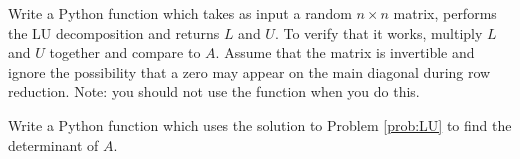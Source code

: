 \begin{problem}
\label{prob:LU}
Write a Python function which takes as input a random $n\times n$ matrix, performs the LU decomposition and returns $L$ and $U$.
To verify that it works, multiply $L$ and $U$ together and compare to $A$.
Assume that the matrix is invertible and ignore the possibility that a zero may appear on the main diagonal during row reduction.
Note: you should not use the  function when you do this.
\end{problem}

\begin{problem}
\label{prob:det}
Write a Python function which uses the solution to Problem \ref{prob:LU} to find the determinant of $A$.
\end{problem}
